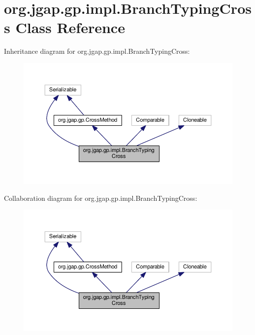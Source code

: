 \hypertarget{classorg_1_1jgap_1_1gp_1_1impl_1_1_branch_typing_cross}{\section{org.\-jgap.\-gp.\-impl.\-Branch\-Typing\-Cross Class Reference}
\label{classorg_1_1jgap_1_1gp_1_1impl_1_1_branch_typing_cross}
}


Inheritance diagram for org.\-jgap.\-gp.\-impl.\-Branch\-Typing\-Cross\-:
\nopagebreak
\begin{figure}[H]
\begin{center}
\leavevmode
\includegraphics[width=350pt]{classorg_1_1jgap_1_1gp_1_1impl_1_1_branch_typing_cross__inherit__graph}
\end{center}
\end{figure}


Collaboration diagram for org.\-jgap.\-gp.\-impl.\-Branch\-Typing\-Cross\-:
\nopagebreak
\begin{figure}[H]
\begin{center}
\leavevmode
\includegraphics[width=350pt]{classorg_1_1jgap_1_1gp_1_1impl_1_1_branch_typing_cross__coll__graph}
\end{center}
\end{figure}

